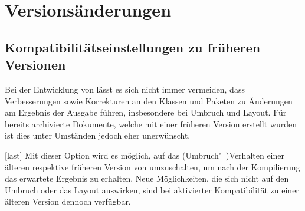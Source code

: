 \chapter{Versionsänderungen}
\section{Kompatibilitätseinstellungen zu früheren Versionen}
Bei der Entwicklung von \TUDScript lässt es sich nicht immer vermeiden, dass 
Verbesserungen sowie Korrekturen an den Klassen und Paketen zu Änderungen am 
Ergebnis der Ausgabe führen, insbesondere bei Umbruch und Layout. Für bereits
archivierte Dokumente, welche mit einer früheren Version erstellt wurden ist 
dies unter Umständen jedoch eher unerwünscht.

\begin{Declaration}[v2.03]{}[last]
\printdeclarationlist%
%
%
Mit dieser Option wird es möglich, auf das (Umbruch"~)Verhalten einer älteren 
respektive früheren Version von \TUDScript umzuschalten, um nach der 
Kompilierung das erwartete Ergebnis zu erhalten. Neue Möglichkeiten, die sich 
nicht auf den Umbruch oder das Layout auswirken, sind bei aktivierter 
Kompatibilität zu einer älteren Version dennoch verfügbar. 


\end{Declaration}
